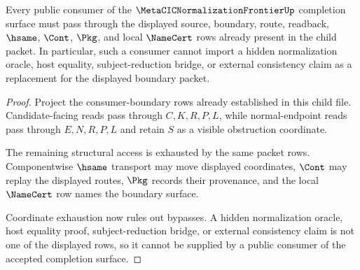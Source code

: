 \begin{theorem}
\label{thm:metacic-normalization-frontier-consumer-boundary-lock}
Every public consumer of the $\MetaCICNormalizationFrontierUp$ completion surface must pass through the displayed source, boundary, route, readback, $\hsame$, $\Cont$, $\Pkg$, and local $\NameCert$ rows already present in the child packet. In particular, such a consumer cannot import a hidden normalization oracle, host equality, subject-reduction bridge, or external consistency claim as a replacement for the displayed boundary packet.
\end{theorem}
\begin{proof}
Project the consumer-boundary rows already established in this child file. Candidate-facing reads pass through $C,K,R,P,L$, while normal-endpoint reads pass through $E,N,R,P,L$ and retain $S$ as a visible obstruction coordinate.

The remaining structural access is exhausted by the same packet rows. Componentwise $\hsame$ transport may move displayed coordinates, $\Cont$ may replay the displayed routes, $\Pkg$ records their provenance, and the local $\NameCert$ row names the boundary surface.

Coordinate exhaustion now rules out bypasses. A hidden normalization oracle, host equality proof, subject-reduction bridge, or external consistency claim is not one of the displayed rows, so it cannot be supplied by a public consumer of the accepted completion surface.
\end{proof}

